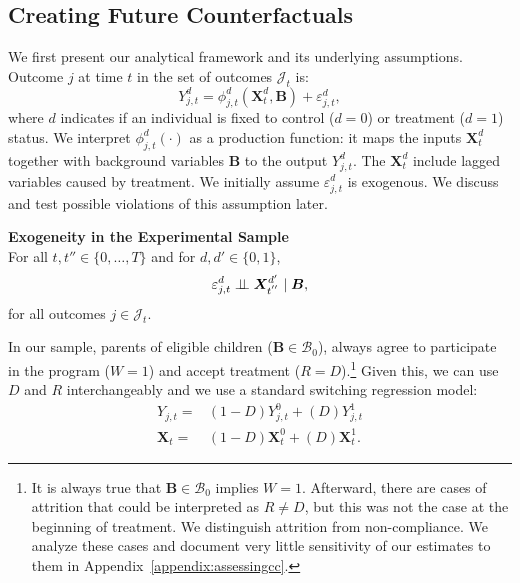 \begin{figure}
\end{figure}

\subsection{Creating Future Counterfactuals}\label{section:just}

We first present our analytical framework and its underlying assumptions. Outcome $j$ at time $t$ in the set of outcomes $\mathcal{J}_{t}$ is:
\begin{equation}\label{eq:outcome}
Y_{j,t}^d = \phi_{j,t}^d \left( \bm{X}_{t}^d, \bm{B} \right) + \varepsilon_{j,t}^d,
\end{equation}
where $d$ indicates if an individual is fixed to control ($d = 0$) or treatment ($d = 1$) status. We interpret  $\phi_{j,t}^d \left( \cdot \right)$ as a production function: it maps the inputs $\bm{X}_{t}^d$ together with background variables $\bm{B}$ to the output $Y_{j,t}^d$. The $\bm{X}^d_t$ include lagged variables caused by treatment. We initially assume $\varepsilon_{j,t}^d$ is exogenous. We discuss and test possible violations of this assumption later.

\begin{assumption}\label{ass:exog} \textbf{Exogeneity in the Experimental Sample}\\
For all $t, t'' \in \{ 0, \ldots, T \}$ and for $d, d' \in \{0,1\}$,
\begin{equation}
\varepsilon^d_{j,t} \perp\!\!\!\perp \bm{X}^{d^{\prime}}_{t^{''}} \mid \bm{B},
\end{equation}
for all outcomes $j \in \mathcal{J}_{t}$.
\end{assumption}

In our sample, parents of eligible children ($\bm{B} \in \mathcal{B}_{0}$), always agree to participate in the program ($W = 1$) and accept treatment ($R = D$).\footnote{It is always true that $\bm{B} \in \mathcal{B}_{0}$ implies $W = 1$. Afterward, there are cases of attrition that could be interpreted as $R \neq D$, but this was not the case at the beginning of treatment. We distinguish attrition from non-compliance. We analyze these cases and document very little sensitivity of our estimates to them in Appendix~\ref{appendix:assessingcc}.} Given this, we can use $D$ and $R$ interchangeably and we use a standard \citet{Quandt_1972_JASA} switching regression model:
\begin{align}
Y_{j,t}     =& \left( 1 - D \right) Y_{j,t}^0    + \left( D \right) Y_{j,t}^1 \nonumber \\
\bm{X}_{t} =& \left( 1 - D \right) \bm{X}_{t}^0 + \left( D \right) \bm{X}_{t}^1. \label{eq:countersystem}
\end{align}

